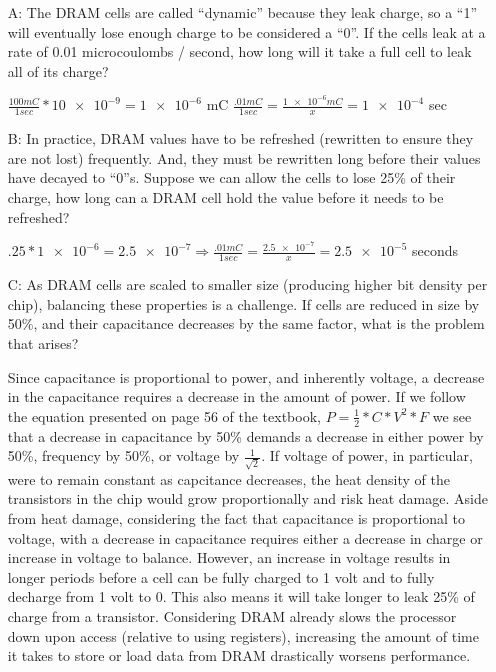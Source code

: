 \documentclass[10pt]{article}
\begin{document}
\begin{itemize}
    \item[A:] The DRAM cells are called “dynamic” because they leak charge, so a “1” will eventually lose enough charge to be considered a “0”. If the cells leak at a rate of 0.01
    microcoulombs / second, how long will it take a full cell to leak all of its charge?
    \item[] $\frac{100mC}{1 sec} * \num{10e-9} = \num{1e-6}$ mC 
    $\frac{.01mC}{1 sec} = \frac{\num{1e-6}mC}{x} = \num{1e-4}$ sec

    \item[B:] In practice, DRAM values have to be refreshed (rewritten to ensure they are not lost)
    frequently. And, they must be rewritten long before their values have decayed to “0”s.
    Suppose we can allow the cells to lose 25\% of their charge, how long can a DRAM
    cell hold the value before it needs to be refreshed?
    \item[]  $.25 * \num{1e-6} = \num{2.5e-7} \Rightarrow \frac{.01 mC}{1 sec} = \frac{\num{2.5e-7}}{x} = \num{2.5e-5}$ seconds 

    \item[C:] As DRAM cells are scaled to smaller size (producing higher bit density per chip),
    balancing these properties is a challenge. If cells are reduced in size by 50\%, and their
    capacitance decreases by the same factor, what is the problem that arises?
    \item[] Since capacitance is proportional to power, and inherently voltage, a decrease in the capacitance requires a decrease in the amount of power. 
    If we follow the equation presented on page 56 of the textbook, $P = \frac{1}{2}*C*V^2*F$ we see that a decrease in capacitance by 50\% demands a decrease in 
    either power by 50\%, frequency by 50\%, or voltage by $\frac{1}{\sqrt{2}}$. If voltage of power, in particular, were to remain constant as capcitance decreases, 
    the heat density of the transistors in the chip would grow proportionally and risk heat damage. Aside from heat damage, considering the fact that capacitance is 
    proportional to voltage, with a decrease in capacitance requires either a decrease in charge or increase in voltage to balance. However, an increase in voltage 
    results in longer periods before a cell can be fully charged to 1 volt and to fully decharge from 1 volt to 0. This also means it will take longer to 
    leak 25\% of charge from a transistor. Considering DRAM already slows the processor down upon access (relative to using registers), increasing the amount of time it takes to 
    store or load data from DRAM drastically worsens performance. 


\end{itemize}
\end{document}
